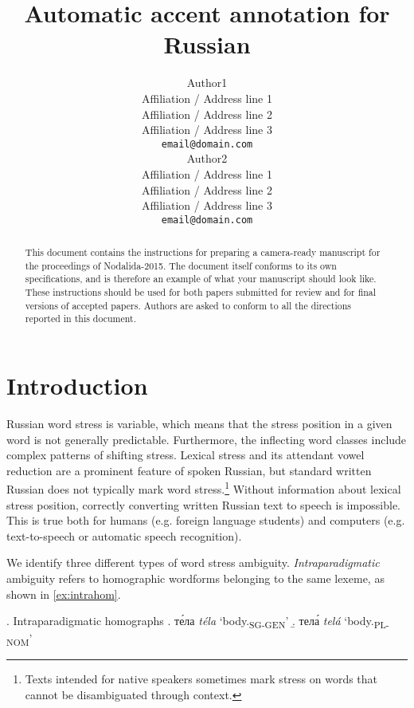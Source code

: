 \documentclass[11pt]{article}
\title{Automatic accent annotation for Russian}
\author{Author1 \\
  Affiliation / Address line 1 \\
  Affiliation / Address line 2 \\
  Affiliation / Address line 3 \\
  {\tt email@domain.com} \\\And
  Author2 \\
  Affiliation / Address line 1 \\
  Affiliation / Address line 2 \\
  Affiliation / Address line 3 \\
  {\tt email@domain.com} \\}
\date{}
\newcommand{\rus}[1]{\foreignlanguage{russian}{#1}}
\begin{document}
\maketitle
\begin{abstract}
  This document contains the instructions for preparing a camera-ready
  manuscript for the proceedings of Nodalida-2015. The document itself
  conforms to its own specifications, and is therefore an example of
  what your manuscript should look like. These instructions should be
  used for both papers submitted for review and for final versions of
  accepted papers.  Authors are asked to conform to all the directions
  reported in this document.
\end{abstract}

%

\section{Introduction}

Russian word stress is variable, which means that the stress position in a given word is not 
generally predictable. Furthermore, the inflecting word classes include complex patterns of
shifting stress. Lexical stress and its attendant vowel reduction are a prominent feature of
spoken Russian, but standard written Russian does not typically mark word stress.\footnote{
Texts intended for native speakers sometimes mark stress on words that cannot be 
disambiguated through context.} Without information about lexical stress position, 
correctly converting written Russian text to speech is impossible. This is true both for humans
(e.g. foreign language students) and computers (e.g. text-to-speech or automatic speech 
recognition).

We identify three different types of word stress ambiguity. \emph{Intraparadigmatic} ambiguity refers
to homographic wordforms belonging to the same lexeme, as shown in \ref{ex:intrahom}. 

\ex. Intraparadigmatic homographs \label{ex:intrahom}
\a. \rus{т\'{е}ла} \emph{t\'{e}la} `body.\textsubscript{SG-GEN}' \label{ex:bodySGGEN}
\b. \rus{тел\'{а}} \emph{tel\'{a}} `body.\textsubscript{PL-NOM}' \label{ex:bodyPLNOM}
\end{document}
